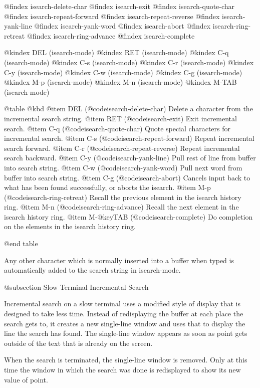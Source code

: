 {{{{@findex isearch-delete-char
@findex isearch-exit
@findex isearch-quote-char
@findex isearch-repeat-forward
@findex isearch-repeat-reverse
@findex isearch-yank-line
@findex isearch-yank-word
@findex isearch-abort
@findex isearch-ring-retreat
@findex isearch-ring-advance
@findex isearch-complete

@kindex DEL (isearch-mode)
@kindex RET (isearch-mode)
@kindex C-q (isearch-mode)
@kindex C-s (isearch-mode)
@kindex C-r (isearch-mode)
@kindex C-y (isearch-mode)
@kindex C-w (isearch-mode)
@kindex C-g (isearch-mode)
@kindex M-p (isearch-mode)
@kindex M-n (isearch-mode)
@kindex M-TAB (isearch-mode)

@table @kbd
@item DEL
(@code{isearch-delete-char})  Delete a character from the incremental
search string.
@item RET
(@code{isearch-exit})  Exit incremental search.
@item C-q
(@code{isearch-quote-char})  Quote special characters for incremental
search.
@item C-s
(@code{isearch-repeat-forward})  Repeat incremental search forward.
@item C-r
(@code{isearch-repeat-reverse})  Repeat incremental search backward.
@item C-y
(@code{isearch-yank-line})  Pull rest of line from buffer into search string.
@item C-w
(@code{isearch-yank-word})  Pull next word from buffer into search
string.
@item C-g
(@code{isearch-abort})  Cancels input back to what has been found
successfully, or aborts the isearch.
@item M-p
(@code{isearch-ring-retreat})  Recall the previous element in the
isearch history ring.
@item M-n
(@code{isearch-ring-advance})  Recall the next element in the
isearch history ring.
@item M-@key{TAB}
(@code{isearch-complete})  Do completion on the elements in the isearch
history ring.

@end table

Any other character which is normally inserted into a buffer when typed
is automatically added to the search string in isearch-mode.

@subsection Slow Terminal Incremental Search

  Incremental search on a slow terminal uses a modified style of display
that is designed to take less time.  Instead of redisplaying the buffer at
each place the search gets to, it creates a new single-line window and uses
that to display the line the search has found.  The single-line window
appears as soon as point gets outside of the text that is already
on the screen.

  When the search is terminated, the single-line window is removed.  Only
at this time the window in which the search was done is redisplayed to show
its new value of point.

}}}}
